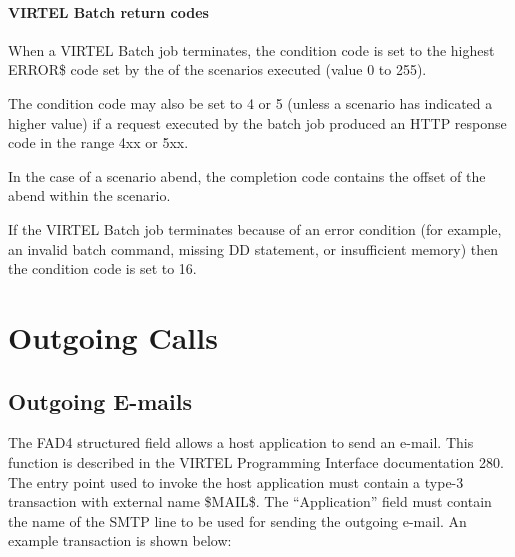 \documentclass[letterpaper,10pt,english]{sphinxmanual}
\begin{document}
\subsubsection{VIRTEL Batch return codes}
\label{\detokenize{User_Guide:virtel-batch-return-codes}}
When a VIRTEL Batch job terminates, the condition code is set to the highest ERROR\$ code set by the of the scenarios
executed (value 0 to 255).

The condition code may also be set to 4 or 5 (unless a scenario has indicated a higher value) if a request executed by
the batch job produced an HTTP response code in the range 4xx or 5xx.

In the case of a scenario abend, the completion code contains the offset of the abend within the scenario.

If the VIRTEL Batch job terminates because of an error condition (for example, an invalid batch command, missing DD
statement, or insufficient memory) then the condition code is set to 16.


\chapter{Outgoing Calls}
\label{\detokenize{User_Guide:outgoing-calls}}

\section{Outgoing E-mails}
\label{\detokenize{User_Guide:outgoing-e-mails}}
The FAD4 structured field allows a host application to send an e-mail. This function is described in the VIRTEL
Programming Interface documentation 280.
The entry point used to invoke the host application must contain a type-3 transaction with external name \$MAIL\$. The
“Application” field must contain the name of the SMTP line to be used for sending the outgoing e-mail.
An example transaction is shown below:
\end{document}
